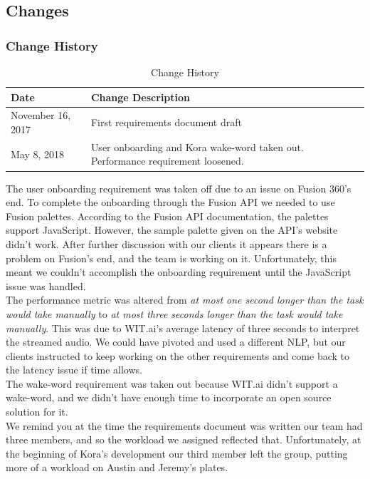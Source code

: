 \documentclass[onecolumn, draftclsnofoot,10pt, compsoc]{IEEEtran}
\newcommand{\newpara}{\\[0.1in]}
\begin{document}
	\subsection{Changes}
		\subsubsection{Change History}
		\begin{table}[H]
			\centering
			\caption{Change History}
			\label{my-label}
			\begin{tabular}{|l|l|}
				\hline
				\textbf{Date}     & \textbf{Change Description}   \\ \hline
				November 16, 2017 & {First requirements document draft} \\ \hline
				May 8, 2018 & {User onboarding and Kora wake-word taken out. Performance requirement loosened.} \\ \hline
			\end{tabular}
		\end{table}

		The user onboarding requirement was taken off due to an issue on Fusion 360's end.
		To complete the onboarding through the Fusion API we needed to use Fusion palettes.
		According to the Fusion API documentation, the palettes support JavaScript. However, the sample palette given on the API's website didn't work.
		After further discussion with our clients it appears there is a problem on Fusion's end, and the team is working on it.
		Unfortunately, this meant we couldn't accomplish the onboarding requirement until the JavaScript issue was handled.
		\newpara
		The performance metric was altered from \textit{at most one second longer than the task would take manually} to \textit{at most three seconds longer than the task would take manually}.
		This was due to WIT.ai's average latency of three seconds to interpret the streamed audio.
		We could have pivoted and used a different NLP, but our clients instructed to keep working on the other requirements and come back to the latency issue if time allows.
		\newpara
		The wake-word requirement was taken out because WIT.ai didn't support a wake-word, and we didn't have enough time to incorporate an open source solution for it.
		\newpara
		We remind you at the time the requirements document was written our team had three members, and so the workload we assigned reflected that. Unfortunately, at the beginning of Kora's development our third member left the group, putting more of a workload on Austin and Jeremy's plates.
\end{document}
